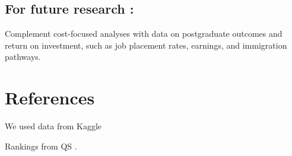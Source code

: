\documentclass[
  letterpaper,
  DIV=11,
  numbers=noendperiod]{scrartcl}
\begin{document}
\subsection{For future research :}\label{for-future-research}

Complement cost-focused analyses with data on postgraduate outcomes and
return on investment, such as job placement rates, earnings, and
immigration pathways.

\section{References}\label{references}

We used data from Kaggle \autocite{edu_cost_2024}

Rankings from QS \autocite{qs2024,qs2025}.


\printbibliography
\end{document}
